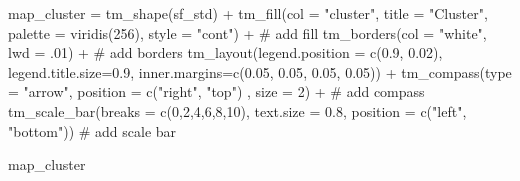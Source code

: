 \documentclass[
  letterpaper,
  DIV=11,
  numbers=noendperiod]{scrreprt}
\newenvironment{Shaded}{\begin{snugshade}}{\end{snugshade}}
\newcommand{\AttributeTok}[1]{\textcolor[rgb]{0.40,0.45,0.13}{#1}}
\newcommand{\CommentTok}[1]{\textcolor[rgb]{0.37,0.37,0.37}{#1}}
\newcommand{\DecValTok}[1]{\textcolor[rgb]{0.68,0.00,0.00}{#1}}
\newcommand{\FloatTok}[1]{\textcolor[rgb]{0.68,0.00,0.00}{#1}}
\newcommand{\FunctionTok}[1]{\textcolor[rgb]{0.28,0.35,0.67}{#1}}
\newcommand{\NormalTok}[1]{\textcolor[rgb]{0.00,0.23,0.31}{#1}}
\newcommand{\OtherTok}[1]{\textcolor[rgb]{0.00,0.23,0.31}{#1}}
\newcommand{\SpecialCharTok}[1]{\textcolor[rgb]{0.37,0.37,0.37}{#1}}
\newcommand{\StringTok}[1]{\textcolor[rgb]{0.13,0.47,0.30}{#1}}
\begin{document}
\begin{Shaded}
\begin{Highlighting}[]
\NormalTok{map\_cluster }\OtherTok{=} \FunctionTok{tm\_shape}\NormalTok{(sf\_std) }\SpecialCharTok{+}
  \FunctionTok{tm\_fill}\NormalTok{(}\AttributeTok{col =} \StringTok{"cluster"}\NormalTok{, }\AttributeTok{title =} \StringTok{"Cluster"}\NormalTok{, }\AttributeTok{palette =} \FunctionTok{viridis}\NormalTok{(}\DecValTok{256}\NormalTok{), }\AttributeTok{style =} \StringTok{"cont"}\NormalTok{) }\SpecialCharTok{+} \CommentTok{\# add fill}
  \FunctionTok{tm\_borders}\NormalTok{(}\AttributeTok{col =} \StringTok{"white"}\NormalTok{, }\AttributeTok{lwd =}\NormalTok{ .}\DecValTok{01}\NormalTok{)  }\SpecialCharTok{+} \CommentTok{\# add borders}
  \FunctionTok{tm\_layout}\NormalTok{(}\AttributeTok{legend.position =} \FunctionTok{c}\NormalTok{(}\FloatTok{0.9}\NormalTok{, }\FloatTok{0.02}\NormalTok{), }\AttributeTok{legend.title.size=}\FloatTok{0.9}\NormalTok{, }\AttributeTok{inner.margins=}\FunctionTok{c}\NormalTok{(}\FloatTok{0.05}\NormalTok{, }\FloatTok{0.05}\NormalTok{, }\FloatTok{0.05}\NormalTok{, }\FloatTok{0.05}\NormalTok{)) }\SpecialCharTok{+}
  \FunctionTok{tm\_compass}\NormalTok{(}\AttributeTok{type =} \StringTok{"arrow"}\NormalTok{, }\AttributeTok{position =} \FunctionTok{c}\NormalTok{(}\StringTok{"right"}\NormalTok{, }\StringTok{"top"}\NormalTok{) , }\AttributeTok{size =} \DecValTok{2}\NormalTok{) }\SpecialCharTok{+} \CommentTok{\# add compass}
  \FunctionTok{tm\_scale\_bar}\NormalTok{(}\AttributeTok{breaks =} \FunctionTok{c}\NormalTok{(}\DecValTok{0}\NormalTok{,}\DecValTok{2}\NormalTok{,}\DecValTok{4}\NormalTok{,}\DecValTok{6}\NormalTok{,}\DecValTok{8}\NormalTok{,}\DecValTok{10}\NormalTok{), }\AttributeTok{text.size =} \FloatTok{0.8}\NormalTok{, }\AttributeTok{position =}  \FunctionTok{c}\NormalTok{(}\StringTok{"left"}\NormalTok{, }\StringTok{"bottom"}\NormalTok{)) }\CommentTok{\# add scale bar}

\NormalTok{map\_cluster}
\end{Highlighting}
\end{Shaded}
\end{document}
